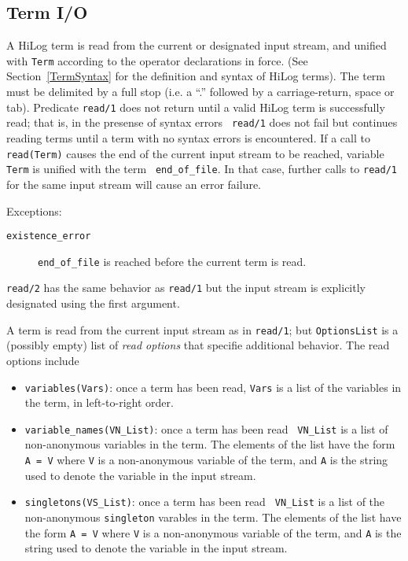 \subsection{Term I/O}
\begin{description}
    A HiLog term is read from the current or designated input stream,
    and unified with {\tt Term} according to the operator declarations
    in force.  (See Section~\ref{TermSyntax} for the definition and
    syntax of HiLog terms). The term must be delimited by a full stop
    (i.e. a ``.'' followed by a carriage-return, space or tab).
    Predicate {\tt read/1} does not return until a valid HiLog term is
    successfully read; that is, in the presense of syntax errors {\tt
    read/1} does not fail but continues reading terms until a term
    with no syntax errors is encountered.  If a call to {\tt
    read(Term)} causes the end of the current input stream to be
    reached, variable {\tt Term} is unified with the term {\tt
    end\_of\_file}.  In that case, further calls to {\tt read/1} for
    the same input stream will cause an error failure.

    Exceptions:
    \begin{description}
    \item[{\tt existence\_error}]
	{\tt end\_of\_file} is reached before the current term is read.
    \end{description}


	{\tt read/2} has the same behavior as {\tt read/1} but the
	input stream is explicitly designated using the first argument.

%
A term is read from the current input stream as in {\tt read/1}; but
{\tt OptionsList} is a (possibly empty) list of {\em read options}
that specifie additional behavior.  The read options include
\begin{itemize}
\item {\tt variables(Vars)}: once a term has been read, {\tt Vars} is a
list of the variables in the term, in left-to-right order. 
\item {\tt variable\_names(VN\_List)}: once a term has been read {\tt
VN\_List} is a list of non-anonymous variables in the term.  The
elements of the list have the form {\tt A = V} where {\tt V} is a
non-anonymous variable of the term, and {\tt A} is the string used to
denote the variable in the input stream.
\item {\tt singletons(VS\_List)}: once a term has been read {\tt
VN\_List} is a list of the non-anonymous {\tt singleton} varables in
the term.  The elements of the list have the form {\tt A = V} where
{\tt V} is a non-anonymous variable of the term, and {\tt A} is the
string used to denote the variable in the input stream.
\end{itemize}


\end{description}
